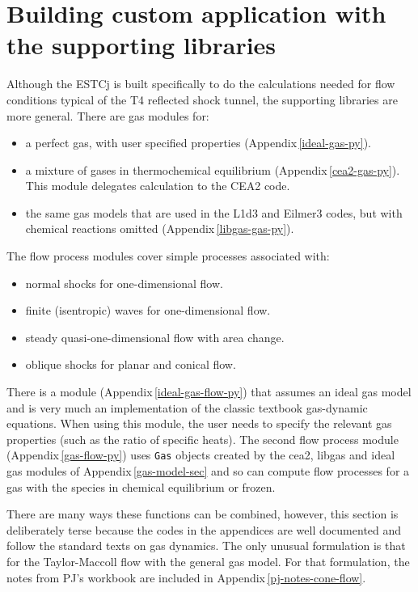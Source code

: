 \documentclass[landscape,12pt,a4paper]{article}
\begin{document}
\section{Building custom application with the supporting libraries}
\label{the-libraries}
%
Although the ESTCj is built specifically to do the calculations 
needed for flow conditions typical of the T4 reflected shock tunnel,
the supporting libraries are more general.
There are gas modules for:
\begin{itemize}
 \item a perfect gas, with user specified properties (Appendix\,\ref{ideal-gas-py}).
 \item a mixture of gases in thermochemical equilibrium (Appendix\,\ref{cea2-gas-py}).
   This module delegates calculation to the CEA2 code.
 \item the same gas models that are used in the L1d3 and Eilmer3 codes,
   but with chemical reactions omitted (Appendix\,\ref{libgas-gas-py}).
\end{itemize}
%
The flow process modules cover simple processes associated with:
\begin{itemize}
 \item normal shocks for one-dimensional flow.
 \item finite (isentropic) waves for one-dimensional flow.
 \item steady quasi-one-dimensional flow with area change.
 \item oblique shocks for planar and conical flow.
\end{itemize}
There is a module (Appendix\,\ref{ideal-gas-flow-py})
that assumes an ideal gas model and is very much an implementation of the classic
textbook gas-dynamic equations.
When using this module, the user needs to specify the
relevant gas properties (such as the ratio of specific heats).
The second flow process module (Appendix\,\ref{gas-flow-py}) uses \verb!Gas! objects
created by the cea2, libgas and ideal gas modules of Appendix\,\ref{gas-model-sec} 
and so can compute flow processes for a gas with the species in chemical equilibrium or frozen.

\medskip
There are many ways these functions can be combined, however,
this section is deliberately terse because the codes in the appendices are well documented
and follow the standard texts on gas dynamics.
The only unusual formulation is that for the Taylor-Maccoll flow with the general gas model.
For that formulation, the notes from PJ's workbook are included 
in Appendix\,\ref{pj-notes-cone-flow}.
\end{document}
